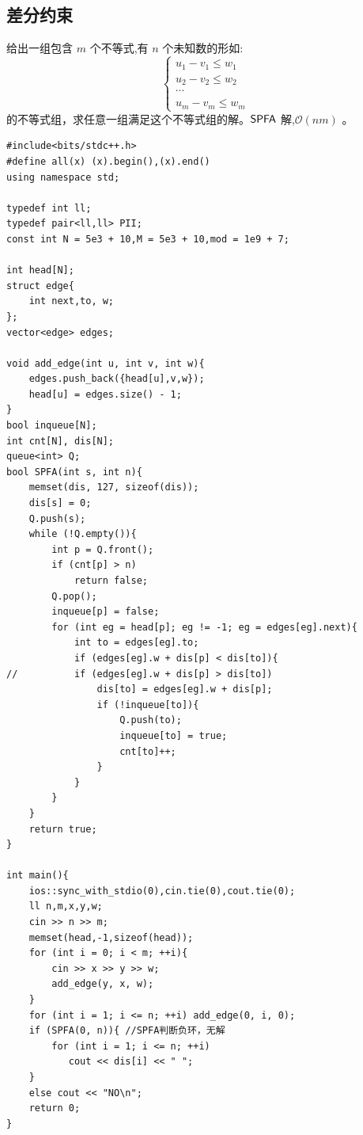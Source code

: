\subsection{差分约束}
给出一组包含 $m$ 个不等式,有 $n$ 个未知数的形如:
$$ \begin{cases} u_1-v_1\leq w_1 \\u_2-v_2 \leq w_2 \\ \cdots\\ u_m -v_m\leq w_m\end{cases}$$
的不等式组，求任意一组满足这个不等式组的解。$\sf SPFA$ 解,$\mathcal O(nm)$ 。
\begin{lstlisting}[caption={}]
#include<bits/stdc++.h>
#define all(x) (x).begin(),(x).end()
using namespace std;

typedef int ll;
typedef pair<ll,ll> PII;
const int N = 5e3 + 10,M = 5e3 + 10,mod = 1e9 + 7;

int head[N];
struct edge{
    int next,to, w;
};
vector<edge> edges;

void add_edge(int u, int v, int w){
    edges.push_back({head[u],v,w});
    head[u] = edges.size() - 1;
}
bool inqueue[N];
int cnt[N], dis[N];
queue<int> Q;
bool SPFA(int s, int n){
    memset(dis, 127, sizeof(dis));
    dis[s] = 0;
    Q.push(s);
    while (!Q.empty()){
        int p = Q.front();
        if (cnt[p] > n)
            return false;
        Q.pop();
        inqueue[p] = false;
        for (int eg = head[p]; eg != -1; eg = edges[eg].next){
            int to = edges[eg].to;
            if (edges[eg].w + dis[p] < dis[to]){
//          if (edges[eg].w + dis[p] > dis[to])
                dis[to] = edges[eg].w + dis[p];
                if (!inqueue[to]){
                    Q.push(to);
                    inqueue[to] = true;
                    cnt[to]++;
                }
            }
        }
    }
    return true;
}

int main(){
    ios::sync_with_stdio(0),cin.tie(0),cout.tie(0);
    ll n,m,x,y,w;
    cin >> n >> m;
    memset(head,-1,sizeof(head));
    for (int i = 0; i < m; ++i){
        cin >> x >> y >> w;
        add_edge(y, x, w);
    }
    for (int i = 1; i <= n; ++i) add_edge(0, i, 0);
    if (SPFA(0, n)){ //SPFA判断负环，无解
        for (int i = 1; i <= n; ++i)
           cout << dis[i] << " ";
    }
    else cout << "NO\n";
	return 0;
}
\end{lstlisting}

